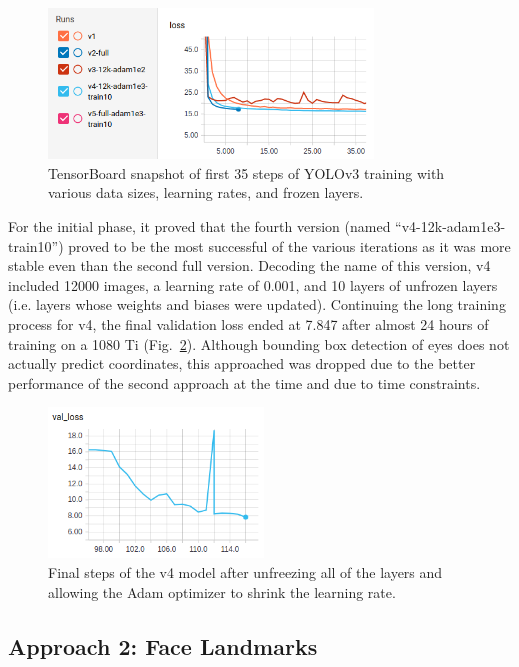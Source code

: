 \documentclass[aip, rsi, amsmath, amssymb, reprint, author-year, longbibliography]{revtex4-1}
\begin{document}
\begin{figure}[h]
\includegraphics[height=4cm]{yolo-loss-initial.png}
\caption{\label{fig:yoloinitial} TensorBoard snapshot of first 35 steps of
  YOLOv3 training with various data sizes, learning rates, and frozen layers.}
\end{figure}

For the initial phase, it proved that the fourth version (named
``v4-12k-adam1e3-train10'') proved to be the most successful of the various
iterations as it was more stable even than the second full version. Decoding the
name of this version, v4 included 12000 images, a learning rate of 0.001, and 10
layers of unfrozen layers (i.e. layers whose weights and biases were updated).
Continuing the long training process for v4, the final validation loss ended at
7.847 after almost 24 hours of training on a 1080 Ti (Fig.~\ref{fig:yoloval}).
Although bounding box detection of eyes does not actually predict coordinates,
this approached was dropped due to the better performance of the second approach
at the time and due to time constraints.

\begin{figure}[t]
\includegraphics[height=4cm]{yolo-final-val-loss.png}
\caption{\label{fig:yoloval} Final steps of the v4 model after unfreezing all of
  the layers and allowing the Adam optimizer to shrink the learning rate.}
\end{figure}

\subsection{\label{sec:level2} Approach 2: Face Landmarks}
\end{document}
